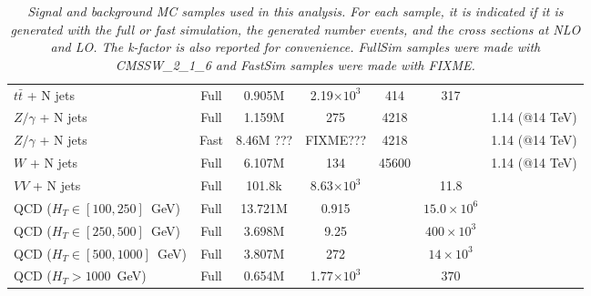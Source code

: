 \begin{table}[htb]
\begin{center}
\begin{tabular}{|l|cccccc|}
\hline
      $t\bar{t}$ + N jets         & Full      & 0.905M    &    2.19$\times 10^3$   & 414                 &  317                  & \\
      $Z/\gamma$ + N jets         & Full      & 1.159M    &     275	           & 4218                &                 & 1.14 (@14 TeV)\\
      $Z/\gamma$ + N jets         & Fast      & 8.46M ??? &     FIXME???	   & 4218                &                 & 1.14 (@14 TeV)\\
      $W$ + N jets                & Full      & 6.107M    &     134	           & 45600               &                 & 1.14 (@14 TeV)\\
      $VV$ + N jets               & Full      & 101.8k    &    8.63$\times 10^3$   &                     & 11.8               & \\ \hline
      QCD ($H_T\in[100,250]$~GeV) & Full      & 13.721M   &    0.915	           &                     & $15.0 \times 10^6$ & \\
      QCD ($H_T\in[250,500]$~GeV) & Full      & 3.698M    &    9.25	           &                     & $400 \times 10^3$  & \\
      QCD ($H_T\in[500,1000]$~GeV)& Full      & 3.807M    &     272	           &                     &  $14 \times 10^3$  & \\
      QCD ($H_T>1000$~GeV)        & Full      & 0.654M    &    1.77$\times 10^3$   &                     & $370$              & \\
\hline\hline
    \end{tabular}
    \caption{\small \sl Signal and background MC samples used in this analysis. For each sample, it is indicated 
      if it is generated with the full or fast simulation, the generated number events, and the cross sections at NLO and LO. 
      The k-factor is also reported for convenience.
      FullSim samples were made with CMSSW\_2\_1\_6 and FastSim samples were made with FIXME.}
  \end{center}
\end{table}

 
